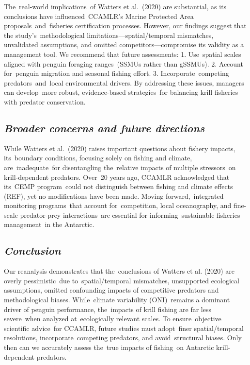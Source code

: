\documentclass[]{elsarticle} %
\begin{document}
The~real-world implications~of Watters et al.~(2020) are substantial, as
its conclusions have influenced~CCAMLR's Marine Protected Area
proposals~and~fisheries certification processes. However, our findings
suggest that the study's~methodological limitations---spatial/temporal
mismatches, unvalidated assumptions, and omitted
competitors---compromise its validity as a management tool. We recommend
that future assessments: 1. Use~spatial scales aligned with penguin
foraging ranges~(SSMUs rather than gSSMUs). 2. Account for~penguin
migration and seasonal fishing effort. 3. Incorporate~competing
predators~and~local environmental drivers. By addressing these issues,
managers can develop~more robust, evidence-based strategies~for
balancing krill fisheries with predator conservation.

\subsection{\texorpdfstring{\emph{Broader concerns and future
directions}}{Broader concerns and future directions}}\label{broader-concerns-and-future-directions}

While Watters et al.~(2020) raises important questions about fishery
impacts, its~boundary conditions, focusing solely on fishing and
climate, are~inadequate~for disentangling the~relative impacts of
multiple stressors~on krill-dependent predators. Over~20 years ago,
CCAMLR acknowledged that its~CEMP program~could not distinguish between
fishing and climate effects (REF), yet no modifications have been made.
Moving forward,~integrated monitoring programs~that account
for~competition, local oceanography, and fine-scale predator-prey
interactions~are essential for informing~sustainable fisheries
management~in the Antarctic.

\subsection{\texorpdfstring{\emph{Conclusion}}{Conclusion}}\label{conclusion}

Our reanalysis demonstrates that the~conclusions of Watters et al.
(2020) are overly pessimistic~due to~spatial/temporal mismatches,
unsupported ecological assumptions, omitted confounding impacts of
competitive predators and methodological biases. While~climate
variability (ONI)~remains a dominant driver of penguin performance,
the~impacts of krill fishing are far less severe~when analyzed
at~ecologically relevant scales. To ensure~objective scientific
advice~for CCAMLR, future studies must adopt~finer spatial/temporal
resolutions, incorporate~competing predators, and avoid~structural
biases. Only then can we accurately assess the~true impacts of
fishing~on Antarctic krill-dependent predators.\newpage
\end{document}
